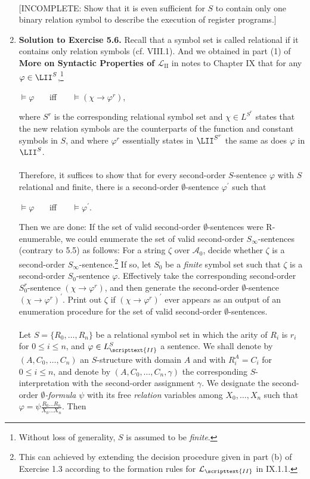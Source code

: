 \begin{enumerate}[1.]
\ \\
$[$INCOMPLETE: Show that it is even sufficient for $S$ to contain only one binary relation symbol to describe the execution of register programs.$]$
%
\item \textbf{Solution to Exercise 5.6.} Recall that a symbol set is called relational if it contains only relation symbols (cf. VIII.1). And we obtained in part (1) of \textbf{More on Syntactic Properties of $\mathcal{L}_\mathrm{II}$} in notes to Chapter IX that for any $\varphi \in \LII^S$,\footnote{Without loss of generality, $S$ is assumed to be \emph{finite}.}
\begin{center}
$\models \varphi$ \ \ \ iff \ \ \ $\models (\chi \rightarrow \varphi^r)$,
\end{center}
where $S^r$ is the corresponding relational symbol set and $\chi \in L^{S^r}$ states that the new relation symbols are the counterparts of the function and constant symbols in $S$, and where $\varphi^r$ essentially states in $\LII^{S^r}$ the same as does $\varphi$ in $\LII^S$.\\
\ \\
Therefore, it suffices to show that for every second-order $S$-sentence $\varphi$ with $S$ relational and finite, there is a second-order $\emptyset$-sentence $\varphi^\prime$ such that
\begin{center}
$\models \varphi$ \ \ \ iff \ \ \ $\models \varphi^\prime$.
\end{center}
Then we are done: If the set of valid second-order $\emptyset$-sentences were R-enumerable, we could enumerate the set of valid second-order $S_\infty$-sentences (contrary to 5.5) as follows: For a string $\zeta$ over $\mathcal{A}_0$, decide whether $\zeta$ is a second-order $S_\infty$-sentence.\footnote{This can achieved by extending the decision procedure given in part (b) of Exercise 1.3 according to the formation rules for $\mathcal{L}_\scripttext{II}$ in IX.1.1.} If so, let $S_0$ be a \emph{finite} symbol set such that $\zeta$ is a second-order $S_0$-sentence $\varphi$. Effectively take the corresponding second-order $S^r_0$-sentence $(\chi \rightarrow \varphi^r)$, and then generate the second-order $\emptyset$-sentence $(\chi \rightarrow \varphi^r)^\prime$. Print out $\zeta$ if $(\chi \rightarrow \varphi^r)^\prime$ ever appears as an output of an enumeration procedure for the set of valid second-order $\emptyset$-sentences.\\
\ \\
Let $S = \{ R_0, \ldots, R_n \}$ be a relational symbol set in which the arity of $R_i$ is $r_i$ for $0 \leq i \leq n$, and $\varphi \in L^S_\scripttext{II}$ a sentence. We shall denote by $(A, C_0, \ldots, C_n)$ an $S$-structure with domain $A$ and with $R_i^A = C_i$ for $0 \leq i \leq n$, and denote by $(A, C_0, \ldots, C_n, \gamma)$ the corresponding $S$-interpretation with the second-order assignment $\gamma$. We designate the second-order \emph{$\emptyset$-formula} $\psi$ with its free \emph{relation} variables among $X_0, \ldots, X_n$ such that $\varphi = \psi \displaystyle\frac{R_0 \ldots R_n}{X_0 \ldots X_n}$. Then

\end{enumerate}
